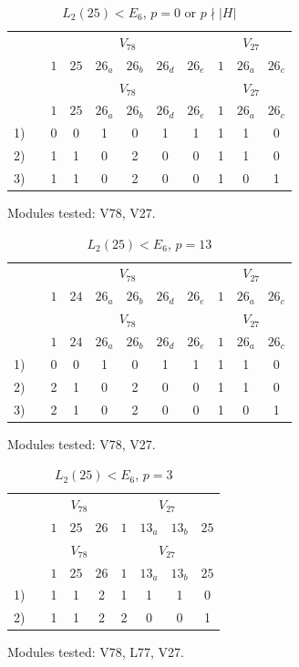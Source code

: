 \setcounter{table}{87}
\begin{longtable}{rc|cccccc|ccc}
\caption{$L_2(25) < E_6$, $p = 0$ or $p \nmid |H|$}\\
& & \multicolumn{6}{c|}{$V_{78}$} & \multicolumn{3}{c}{$V_{27}$} \\
& & $1$ & $25$ & $26_{a}$ & $26_{b}$ & $26_{d}$ & $26_{e}$ & $1$ & $26_{a}$ & $26_{c}$ \\ \hline
\endfirsthead
& & \multicolumn{6}{c|}{$V_{78}$} & \multicolumn{3}{c}{$V_{27}$} \\
& & $1$ & $25$ & $26_{a}$ & $26_{b}$ & $26_{d}$ & $26_{e}$ & $1$ & $26_{a}$ & $26_{c}$ \\ \hline
\endhead
1) &  & 0 & 0 & 1 & 0 & 1 & 1 & 1 & 1 & 0 \\
2) &  & 1 & 1 & 0 & 2 & 0 & 0 & 1 & 1 & 0 \\
3) &  & 1 & 1 & 0 & 2 & 0 & 0 & 1 & 0 & 1 \\
\end{longtable}
\noindent Modules tested: V78, V27.\\

\setcounter{table}{88}
\begin{longtable}{rc|cccccc|ccc}
\caption{$L_2(25) < E_6$, $p = 13$}\\
& & \multicolumn{6}{c|}{$V_{78}$} & \multicolumn{3}{c}{$V_{27}$} \\
& & $1$ & $24$ & $26_{a}$ & $26_{b}$ & $26_{d}$ & $26_{e}$ & $1$ & $26_{a}$ & $26_{c}$ \\ \hline
\endfirsthead
& & \multicolumn{6}{c|}{$V_{78}$} & \multicolumn{3}{c}{$V_{27}$} \\
& & $1$ & $24$ & $26_{a}$ & $26_{b}$ & $26_{d}$ & $26_{e}$ & $1$ & $26_{a}$ & $26_{c}$ \\ \hline
\endhead
1) &  & 0 & 0 & 1 & 0 & 1 & 1 & 1 & 1 & 0 \\
2) &  & 2 & 1 & 0 & 2 & 0 & 0 & 1 & 1 & 0 \\
3) &  & 2 & 1 & 0 & 2 & 0 & 0 & 1 & 0 & 1 \\
\end{longtable}
\noindent Modules tested: V78, V27.\\

\setcounter{table}{89}
\begin{longtable}{rc|ccc|cccc}
\caption{$L_2(25) < E_6$, $p = 3$}\\
& & \multicolumn{3}{c|}{$V_{78}$} & \multicolumn{4}{c}{$V_{27}$} \\
& & $1$ & $25$ & $26$ & $1$ & $13_{a}$ & $13_{b}$ & $25$ \\ \hline
\endfirsthead
& & \multicolumn{3}{c|}{$V_{78}$} & \multicolumn{4}{c}{$V_{27}$} \\
& & $1$ & $25$ & $26$ & $1$ & $13_{a}$ & $13_{b}$ & $25$ \\ \hline
\endhead
1) &  & 1 & 1 & 2 & 1 & 1 & 1 & 0 \\
2) &  & 1 & 1 & 2 & 2 & 0 & 0 & 1 \\
\end{longtable}
\noindent Modules tested: V78, L77, V27.\\

